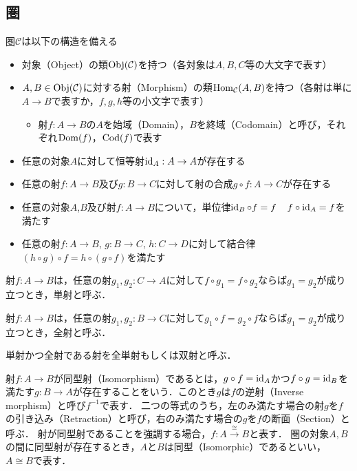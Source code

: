 \documentclass[type_judgement.tex]{subfiles}
\begin{document}
\subsection{圏}
\begin{defn}[Category（圏）]
圏$\mathcal{C}$は以下の構造を備える
\begin{itemize}
    \item 対象（Object）の類$\mathop{\mathrm{Obj}}\nolimits(\mathcal{C})$を持つ（各対象は$A,B,C$等の大文字で表す）
    \item $A,B\in\mathop{\mathrm{Obj}}\nolimits(\mathcal{C})$に対する射（Morphism）の類$\mathop{\mathrm{Hom}}\nolimits_\mathcal{C}(A,B)$を持つ（各射は単に$A \rightarrow B$で表すか，$f,g,h$等の小文字で表す）
        \begin{itemize}
            \item 射$f:A \rightarrow B$の$A$を始域（Domain），$B$を終域（Codomain）と呼び，それぞれ$\mathop{\mathrm{Dom}}\nolimits(f)$，$\mathop{\mathrm{Cod}}\nolimits(f)$で表す
        \end{itemize}
    \item 任意の対象$A$に対して恒等射$\mathop{\mathrm{id}}\nolimits_A:A \rightarrow A$が存在する
    \item 任意の射$f:A \rightarrow B$及び$g:B \rightarrow C$に対して射の合成$g \circ f: A \rightarrow C$が存在する
    \item 任意の対象$A$,$B$及び射$f:A \rightarrow B$について，単位律$\mathop{\mathrm{id}}\nolimits_B \circ f = f$　$f \circ \mathop{\mathrm{id}}\nolimits_A = f$を満たす
    \item 任意の射$f:A \rightarrow B$, $g:B \rightarrow C$, $h:C \rightarrow D$に対して結合律$(h \circ g) \circ f = h \circ (g \circ f)$を満たす
\end{itemize}

\begin{defn}[Monomorphism（単射）]
射$f:A \rightarrow B$は，任意の射$g_1,g_2:C \rightarrow A$に対して$f \circ g_1 = f \circ g_2$ならば$g_1 = g_2$が成り立つとき，単射と呼ぶ．
\end{defn}

\begin{defn}[Epimorphism（全射）]
射$f:A \rightarrow B$は，任意の射$g_1,g_2:B \rightarrow C$に対して$g_1 \circ f = g_2 \circ f$ならば$g_1 = g_2$が成り立つとき，全射と呼ぶ．
\end{defn}

\begin{defn}[Bimorphism（双射）]
単射かつ全射である射を全単射もしくは双射と呼ぶ．
\end{defn}

\begin{defn}
射$f:A \rightarrow B$が同型射（Isomorphism）であるとは，$g \circ f = \mathop{\mathrm{id}}\nolimits_A$かつ$f \circ g = \mathop{\mathrm{id}}\nolimits_B$を満たす$g:B \rightarrow A$が存在することをいう．このとき$g$は$f$の逆射（Inverse morphism）と呼び$f^{-1}$で表す．
二つの等式のうち，左のみ満たす場合の射$g$を$f$の引き込み（Retraction）と呼び，右のみ満たす場合の$g$を$f$の断面（Section）と呼ぶ．
射が同型射であることを強調する場合，$f:A \xrightarrow{\cong} B$と表す．
圏の対象$A,B$の間に同型射が存在するとき，$A$と$B$は同型（Isomorphic）であるといい，$A \cong B$で表す．
\end{defn}


\end{defn}
\end{document}
